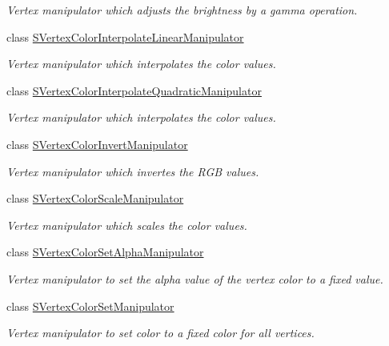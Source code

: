 \begin{DoxyCompactItemize}
\begin{DoxyCompactList}\small\item\em Vertex manipulator which adjusts the brightness by a gamma operation. \end{DoxyCompactList}\item 
class \hyperlink{classirr_1_1scene_1_1SVertexColorInterpolateLinearManipulator}{S\+Vertex\+Color\+Interpolate\+Linear\+Manipulator}
\begin{DoxyCompactList}\small\item\em Vertex manipulator which interpolates the color values. \end{DoxyCompactList}\item 
class \hyperlink{classirr_1_1scene_1_1SVertexColorInterpolateQuadraticManipulator}{S\+Vertex\+Color\+Interpolate\+Quadratic\+Manipulator}
\begin{DoxyCompactList}\small\item\em Vertex manipulator which interpolates the color values. \end{DoxyCompactList}\item 
class \hyperlink{classirr_1_1scene_1_1SVertexColorInvertManipulator}{S\+Vertex\+Color\+Invert\+Manipulator}
\begin{DoxyCompactList}\small\item\em Vertex manipulator which invertes the R\+GB values. \end{DoxyCompactList}\item 
class \hyperlink{classirr_1_1scene_1_1SVertexColorScaleManipulator}{S\+Vertex\+Color\+Scale\+Manipulator}
\begin{DoxyCompactList}\small\item\em Vertex manipulator which scales the color values. \end{DoxyCompactList}\item 
class \hyperlink{classirr_1_1scene_1_1SVertexColorSetAlphaManipulator}{S\+Vertex\+Color\+Set\+Alpha\+Manipulator}
\begin{DoxyCompactList}\small\item\em Vertex manipulator to set the alpha value of the vertex color to a fixed value. \end{DoxyCompactList}\item 
class \hyperlink{classirr_1_1scene_1_1SVertexColorSetManipulator}{S\+Vertex\+Color\+Set\+Manipulator}
\begin{DoxyCompactList}\small\item\em Vertex manipulator to set color to a fixed color for all vertices. \end{DoxyCompactList}\item 

\end{DoxyCompactItemize}
